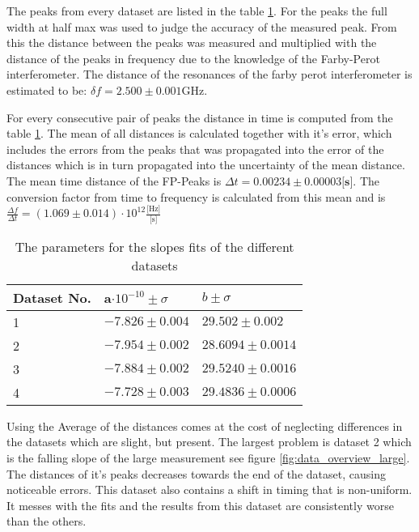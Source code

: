 The peaks from every dataset are listed in the table \ref{tab:freq_peaks}. For the peaks the full width at half max was used to judge the accuracy of
the measured peak. From this the distance between the peaks was measured and multiplied with the distance of the peaks in frequency due to the
knowledge of the Farby-Perot interferometer. The distance of the resonances of the farby perot interferometer is estimated to be: $\delta f = 2.500
\pm 0.001 \text{GHz}$.

For every consecutive pair of peaks the distance in time is computed from the table \ref{tab:freq_peaks}. The mean of all distances is calculated
together with it's error, which includes the errors from the peaks that was propagated into the error of the distances which is in turn propagated
into the uncertainty of the mean distance. The mean time distance of the FP-Peaks is $\Delta t = 0.00234 \pm 0.00003 \textbf{[s]}$. The conversion
factor from time to frequency is calculated from this mean and is $\frac{\Delta f}{\Delta t} =(1.069  \pm 0.014) \cdot 10^{12}
\frac{\text{[Hz]}}{\text{[s]}}$
\begin{table}
	\begin{center}
		\label{tab:freq_peaks}
		\begin{tabular}{|m{10em} m{10em} m{10em}|}
			\hline
			\textbf{Dataset No.} & a$\cdot10^{-10}\pm \sigma$  & $b \pm \sigma$ \\
			\hline\hline
			1 & $-7.826 \pm 0.004$ & $29.502 \pm 0.002$ \\
			2 & $-7.954 \pm 0.002$ & $28.6094 \pm 0.0014$ \\
			3 & $-7.884 \pm 0.002$ & $29.5240 \pm 0.0016$ \\
			4 & $-7.728 \pm 0.003$ & $29.4836 \pm 0.0006$ \\
			\hline
		\end{tabular}
		\caption{The parameters for the slopes fits of the different datasets}
	\end{center}
\end{table}
Using the Average of the distances comes at the cost of neglecting differences in the datasets which are slight, but present. The largest problem is
dataset 2 which is the falling slope of the large measurement see figure \ref{fig:data_overview_large}. The distances of it's peaks decreases towards
the end of the dataset, causing noticeable errors. This dataset also contains a shift in timing that is non-uniform. It messes with the fits and the
results from this dataset are consistently worse than the others.


